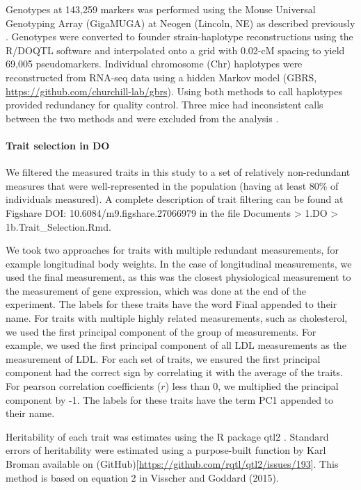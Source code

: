 \documentclass[
]{article}
\begin{document}
Genotypes at 143,259 markers was performed using the Mouse Universal
Genotyping Array (GigaMUGA) \cite{pmid26684931} at Neogen (Lincoln, NE)
as described previously \cite{pmid29567659, pmid22345611}. Genotypes
were converted to founder strain-haplotype reconstructions using the
R/DOQTL software \cite{pmid25237114} and interpolated onto a grid with
0.02-cM spacing to yield 69,005 pseudomarkers. Individual chromosome
(Chr) haplotypes were reconstructed from RNA-seq data using a hidden
Markov model \cite{choi2020genotype} (GBRS,
\url{https://github.com/churchill-lab/gbrs}). Using both methods to call
haplotypes provided redundancy for quality control. Three mice had
inconsistent calls between the two methods and were excluded from the
analysis \cite{pmid29567659}.

\paragraph{Trait selection in DO}\label{trait-selection-in-do}

We filtered the measured traits in this study to a set of relatively
non-redundant measures that were well-represented in the population
(having at least 80\% of individuals measured). A complete description
of trait filtering can be found at Figshare DOI:
10.6084/m9.figshare.27066979 \cite{cube_data} in the file Documents
\textgreater{} 1.DO \textgreater{} 1b.Trait\_Selection.Rmd.

We took two approaches for traits with multiple redundant measurements,
for example longitudinal body weights. In the case of longitudinal
measurements, we used the final measurement, as this was the closest
physiological measurement to the measurement of gene expression, which
was done at the end of the experiment. The labels for these traits have
the word Final appended to their name. For traits with multiple highly
related measurements, such as cholesterol, we used the first principal
component of the group of measurements. For example, we used the first
principal component of all LDL measurements as the measurement of LDL.
For each set of traits, we ensured the first principal component had the
correct sign by correlating it with the average of the traits. For
pearson correlation coefficients (\(r\)) less than 0, we multiplied the
principal component by -1. The labels for these traits have the term PC1
appended to their name.

Heritability of each trait was estimates using the R package qtl2
\cite{pmid30591514}. Standard errors of heritability were estimated
using a purpose-built function by Karl Broman available on
(GitHub){[}\url{https://github.com/rqtl/qtl2/issues/193}{]}. This method
is based on equation 2 in Visscher and Goddard
(2015)\cite{pmid25361897}.
\end{document}
